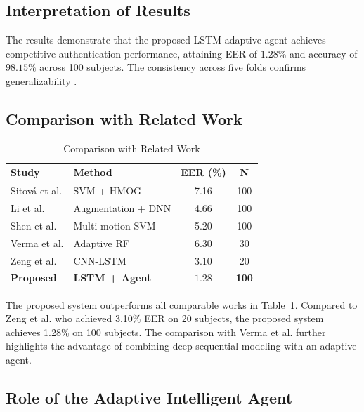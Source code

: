 \documentclass[3p,times,procedia]{elsarticle}
\begin{document}
\subsection{Interpretation of Results}

The results demonstrate that the proposed LSTM adaptive agent
achieves competitive authentication performance, attaining
EER of $1.28\%$ and accuracy of $98.15\%$ across 100 subjects.
The consistency across five folds confirms generalizability
\cite{abuhamad_autosen_2020}.

\subsection{Comparison with Related Work}

\begin{table}[h]
\centering
\caption{Comparison with Related Work}
\label{tab:literature}
\begin{tabular}{llcc}
\hline
\textbf{Study} & \textbf{Method} &
\textbf{EER (\%)} & \textbf{N} \\
\hline
Sitov\'{a} et al. \cite{sitova_hmog_2016}
& SVM + HMOG & 7.16 & 100 \\
Li et al. \cite{li_using_2019}
& Augmentation + DNN & 4.66 & 100 \\
Shen et al. \cite{shen_performance_2018}
& Multi-motion SVM & 5.20 & 100 \\
Verma et al. \cite{verma_data-driven_2022}
& Adaptive RF & 6.30 & 30 \\
Zeng et al. \cite{zeng_gait-based_2021}
& CNN-LSTM & 3.10 & 20 \\
\textbf{Proposed}
& \textbf{LSTM + Agent} & $\mathbf{1.28}$ & \textbf{100} \\
\hline
\end{tabular}
\end{table}

The proposed system outperforms all comparable works in
Table~\ref{tab:literature}. Compared to Zeng et al.
\cite{zeng_gait-based_2021} who achieved 3.10\% EER on 20 subjects, the
proposed system achieves 1.28\% on 100 subjects. The
comparison with Verma et al. \cite{verma_data-driven_2022} further
highlights the advantage of combining deep sequential modeling
with an adaptive agent.

\subsection{Role of the Adaptive Intelligent Agent}
\end{document}
